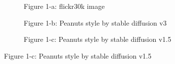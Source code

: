\documentclass{article}
\begin{document}
\begin{enumerate}
\begin{figure}[h!]
		\begin{subfigure}[t]{0.3\textwidth} %
			\centering
			\caption{Figure 1-a: flickr30k image}
		\end{subfigure}
		\hfill
		\begin{subfigure}[t]{0.3\textwidth}
			\centering
			\caption{Figure 1-b: Peanuts style by stable diffusion v3}
		\end{subfigure}
		\hfill
		\begin{subfigure}[t]{0.3\textwidth}
			\centering
			\caption{Figure 1-c: Peanuts style by stable diffusion v1.5}
		\end{subfigure}
	\end{figure}

\end{enumerate}
\end{document}
